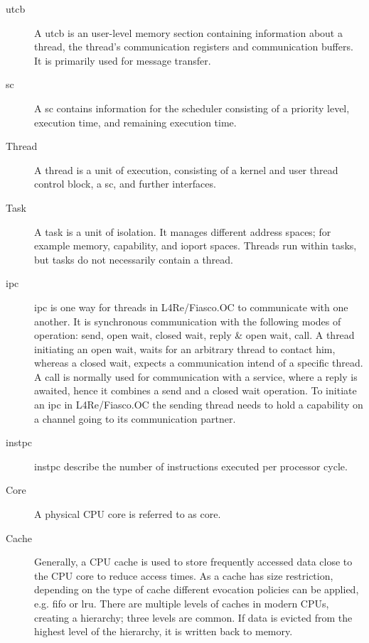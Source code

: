 \begin{description}
  \item[\Gls{utcb}] A \gls{utcb} is an user-level memory section containing
    information about a thread, the thread's communication registers and
    communication buffers. It is primarily used for message transfer.

  \item[\Gls{sc}] A \gls{sc} contains information for the scheduler consisting
    of a priority level, execution time, and remaining execution time.

  \item[Thread] A thread is a unit of execution, consisting of a kernel and
    user thread control block, a \gls{sc}, and further interfaces.

  \item[Task] A task is a unit of isolation. It manages different address
    spaces; for example memory, capability, and ioport spaces.
    Threads run within tasks, but tasks do not necessarily contain a thread.

  \item[\Gls{ipc}] \Gls{ipc} is one way for threads in L4Re/Fiasco.OC
    to communicate with one another.
    It is synchronous communication with the following modes of operation:
    send, open wait, closed wait, reply \& open wait, call.
    A thread initiating an open wait, waits for an arbitrary thread to contact
    him, whereas a closed wait, expects a communication intend of a specific
    thread.
    A call is normally used for communication with a service, where a reply is
    awaited, hence it combines a send and a closed wait operation.
    To initiate an \gls{ipc} in L4Re/Fiasco.OC the sending thread needs to hold
    a capability on a channel going to its communication partner.

  \item[\Gls{instpc}] \Gls{instpc} describe the number of instructions executed
    per processor cycle.


  \item[Core] A physical CPU core is referred to as core.

  \item[Cache] Generally, a CPU cache is used to store frequently accessed data
    close to the CPU core to reduce access times.
    As a cache has size restriction, depending on the type of cache different
    evocation policies can be applied, e.g. \gls{fifo} or \gls{lru}.
    There are multiple levels of caches in modern CPUs, creating a hierarchy;
    three levels are common.
    If data is evicted from the highest level of the hierarchy, it is written
    back to memory.


\end{description}
